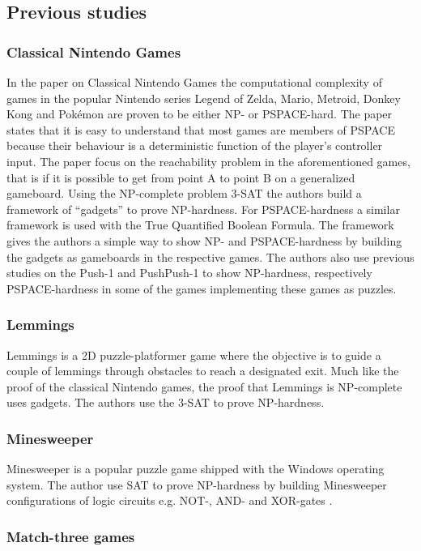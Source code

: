 \subsection{Previous studies}
\subsubsection{Classical Nintendo Games}

In the paper on Classical Nintendo Games the computational complexity of games in the popular Nintendo series Legend of Zelda, Mario, Metroid, Donkey Kong and Pokémon are proven to be either NP- or PSPACE-hard. The paper states that it is easy to understand that most games are members of PSPACE because their behaviour is a deterministic function of the player's controller input. The paper focus on the reachability problem in the aforementioned games, that is if it is possible to get from point A to point B on a generalized gameboard. Using the NP-complete problem 3-SAT the authors build a framework of ``gadgets'' to prove NP-hardness. For PSPACE-hardness a similar framework is used with the True Quantified Boolean Formula. The framework gives the authors a simple way to show NP- and PSPACE-hardness by building the gadgets as gameboards in the respective games. The authors also use previous studies on the Push-1 \cite{push1} and PushPush-1 \cite{pushpushk} to show NP-hardness, respectively PSPACE-hardness in some of the games implementing these games as puzzles. 

\subsubsection{Lemmings}

Lemmings is a 2D puzzle-platformer game where the objective is to guide a couple of lemmings through obstacles to reach a designated exit. Much like the proof of the classical Nintendo games, the proof that Lemmings is NP-complete uses gadgets. The authors use the 3-SAT to prove NP-hardness. 

\subsubsection{Minesweeper}
Minesweeper is a popular puzzle game shipped with the Windows operating system. The author use SAT to prove NP-hardness by building Minesweeper configurations of logic circuits e.g. NOT-, AND- and XOR-gates \cite{minesweeper}.

\subsubsection{Match-three games}

